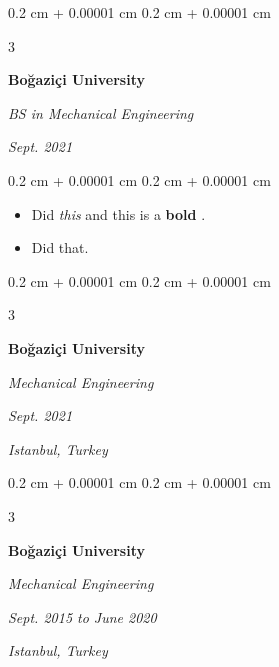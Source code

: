 \documentclass[10pt, letterpaper]{article}
\newenvironment{highlights}{
    \begin{itemize}[
        topsep=0.10 cm,
        parsep=0.10 cm,
        partopsep=0pt,
        itemsep=0pt,
        leftmargin=0.4 cm + 10pt + 0.6 cm
    ]
}{
    \end{itemize}
} %
\newenvironment{onecolentry}{
    \begin{adjustwidth}{
        0.2 cm + 0.00001 cm
    }{
        0.2 cm + 0.00001 cm
    }
}{
    \end{adjustwidth}
} %
\newenvironment{threecolentry}[3][]{
    \onecolentry
    \def\thirdColumn{#3}
    \setcolumnwidth{0.6 cm, \fill, 4.1 cm}
    \begin{paracol}{3}
    #2 \switchcolumn
}{
    \switchcolumn \raggedleft \thirdColumn
    \end{paracol}
    \endonecolentry
} %
\let\hrefWithoutArrow\href
\renewcommand{\href}[2]{\hrefWithoutArrow{#1}{\mbox{\ifthenelse{\equal{#2}{}}{ }{#2 }\raisebox{.15ex}{\footnotesize \faExternalLink*}}}}
\begin{document}
        \vspace{0.2 cm}

        \begin{threecolentry}{
            \vspace*{\fill}
            \textbullet
            \vspace*{3px}
            \vspace*{\fill}
        }{
        \textit{Sept. 2021}
            
        }
            \textbf{Boğaziçi University}

            \textit{BS in Mechanical Engineering}
        \end{threecolentry}

        \vspace{0.10 cm}
        \begin{onecolentry}
            \begin{highlights}
                \item Did \textit{this} and this is a \textbf{bold} \href{https://example.com}{link}.
                \item Did that.
            \end{highlights}
        \end{onecolentry}


        \vspace{0.2 cm}

        \begin{threecolentry}{
            \vspace*{\fill}
            \textbullet
            \vspace*{3px}
            \vspace*{\fill}
        }{
        \textit{Sept. 2021}
            
        \textit{Istanbul, Turkey}}
            \textbf{Boğaziçi University}

            \textit{Mechanical Engineering}
        \end{threecolentry}



        \vspace{0.2 cm}

        \begin{threecolentry}{
            \vspace*{\fill}
            \textbullet
            \vspace*{3px}
            \vspace*{\fill}
        }{
        \textit{Sept. 2015 to June 2020}
            
        \textit{Istanbul, Turkey}}
            \textbf{Boğaziçi University}

            \textit{Mechanical Engineering}
        \end{threecolentry}
\end{document}

